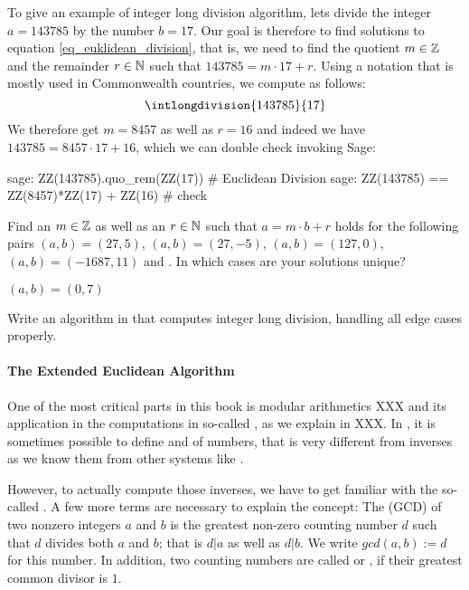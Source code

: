 \begin{example} To give an example of integer long division algorithm, lets divide the integer $a=143785$ by the number $b=17$. Our goal is therefore to find solutions to equation \ref{eq_euklidean_division}, that is, we need to find the quotient $m\in\mathbb{Z}$ and the remainder $r \in \mathbb{N}$ such that $143785 = m\cdot 17 + r$. Using a notation that is mostly used in Commonwealth countries, we compute as follows:
\begin{equation}
\intlongdivision{143785}{17}
\end{equation}
We therefore get $m=8457$ as well as $r=16$ and indeed we have $143785 = 8457\cdot 17 + 16$, which we can double check invoking Sage:
\begin{sagecommandline}
sage: ZZ(143785).quo_rem(ZZ(17)) # Euclidean Division
sage: ZZ(143785) == ZZ(8457)*ZZ(17) + ZZ(16) # check
\end{sagecommandline}

\end{example}
\begin{exercise}
Find an $m\in\mathbb{Z}$ as well as an $r\in\mathbb{N}$ such that $a= m\cdot b +r$ holds for the following pairs $(a,b) = (27,5)$, $(a,b)=(27,-5)$, $(a,b)=(127,0)$, $(a,b)= (-1687, 11)$ and . In which cases are your solutions unique?
\end{exercise}$(a,b)= (0, 7)$
\begin{exercise}
Write an algorithm in  that computes integer long division, handling all edge cases properly.
\end{exercise}

\paragraph{The Extended Euclidean Algorithm}
One of the most critical parts in this book is modular arithmetics XXX and its application in the computations in so-called , as we explain in XXX. In , it is sometimes possible to define  and  of numbers, that is very different from inverses as we know them from other systems like . 

However, to actually compute those inverses, we have to get familiar with the so-called . A few more terms are necessary to explain the concept: The  (GCD) of two nonzero integers $a$ and $b$ is the greatest non-zero counting number $d$ such that $d$ divides both $a$ and $b$; that is $d|a$ as well as $d|b$. We write $ gcd (a, b):=d $ for this number. In addition, two counting numbers are called  or , if their greatest common divisor is $1$.

